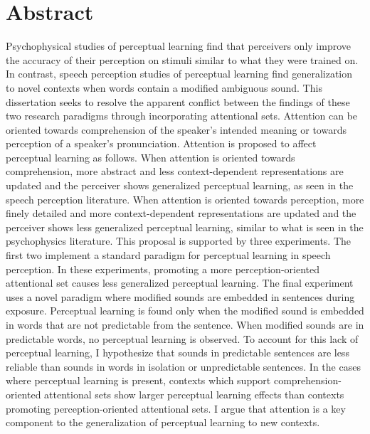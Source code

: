 
\chapter{Abstract}

Psychophysical studies of perceptual learning find that perceivers only improve the accuracy of their perception on stimuli similar to what they were trained on.
In contrast, speech perception studies of perceptual learning find generalization to novel contexts when words contain a modified ambiguous sound.
This dissertation seeks to resolve the apparent conflict between the findings of these two research paradigms through incorporating attentional sets.
Attention can be oriented towards comprehension of the speaker's intended meaning or towards perception of a speaker's pronunciation.
Attention is proposed to affect perceptual learning as follows.
When attention is oriented towards comprehension, more abstract and less context-dependent representations are updated and the perceiver shows generalized perceptual learning, as seen in the speech perception literature.
When attention is oriented towards perception, more finely detailed and more context-dependent representations are updated and the perceiver shows less generalized perceptual learning, similar to what is seen in the psychophysics literature.
This proposal is supported by three experiments.
The first two implement a standard paradigm for perceptual learning in speech perception.
In these experiments, promoting a more perception-oriented attentional set causes less generalized perceptual learning.
The final experiment uses a novel paradigm where modified sounds are embedded in sentences during exposure.
Perceptual learning is found only when the modified sound is embedded in words that are not predictable from the sentence.
When modified sounds are in predictable words, no perceptual learning is observed.
To account for this lack of perceptual learning, I hypothesize that sounds in predictable sentences are less reliable than sounds in words in isolation or unpredictable sentences.
In the cases where perceptual learning is present, contexts which support comprehension-oriented attentional sets show larger perceptual learning effects than contexts promoting perception-oriented attentional sets.
I argue that attention is a key component to the generalization of perceptual learning to new contexts.


